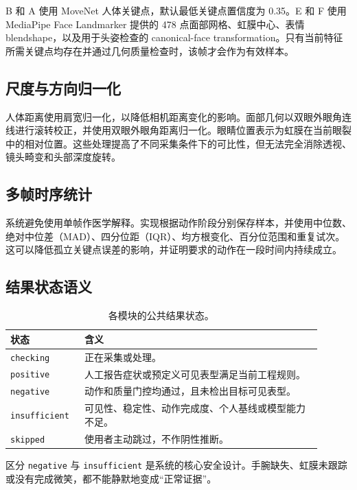 \documentclass[11pt,a4paper]{article}
\begin{document}
B 和 A 使用 MoveNet 人体关键点，默认最低关键点置信度为 0.35。E 和 F 使用 MediaPipe Face Landmarker 提供的 478 点面部网格、虹膜中心、表情 blendshape，以及用于头姿检查的 canonical-face transformation。只有当前特征所需关键点均存在并通过几何质量检查时，该帧才会作为有效样本。

\subsection{尺度与方向归一化}

人体距离使用肩宽归一化，以降低相机距离变化的影响。面部几何以双眼外眼角连线进行滚转校正，并使用双眼外眼角距离归一化。眼睛位置表示为虹膜在当前眼裂中的相对位置。这些处理提高了不同采集条件下的可比性，但无法完全消除透视、镜头畸变和头部深度旋转。

\subsection{多帧时序统计}

系统避免使用单帧作医学解释。实现根据动作阶段分别保存样本，并使用中位数、绝对中位差（MAD）、四分位距（IQR）、均方根变化、百分位范围和重复试次。这可以降低孤立关键点误差的影响，并证明要求的动作在一段时间内持续成立。

\subsection{结果状态语义}

\begin{table}[htbp]
\centering
\caption{各模块的公共结果状态。}
\begin{tabular}{p{0.20\linewidth}p{0.70\linewidth}}
\toprule
状态 & 含义 \\
\midrule
\texttt{checking} & 正在采集或处理。 \\
\texttt{positive} & 人工报告症状或预定义可见表型满足当前工程规则。 \\
\texttt{negative} & 动作和质量门控均通过，且未检出目标可见表型。 \\
\texttt{insufficient} & 可见性、稳定性、动作完成度、个人基线或模型能力不足。 \\
\texttt{skipped} & 使用者主动跳过，不作阴性推断。 \\
\bottomrule
\end{tabular}
\end{table}

区分 \texttt{negative} 与 \texttt{insufficient} 是系统的核心安全设计。手腕缺失、虹膜未跟踪或没有完成微笑，都不能静默地变成“正常证据”。
\end{document}
